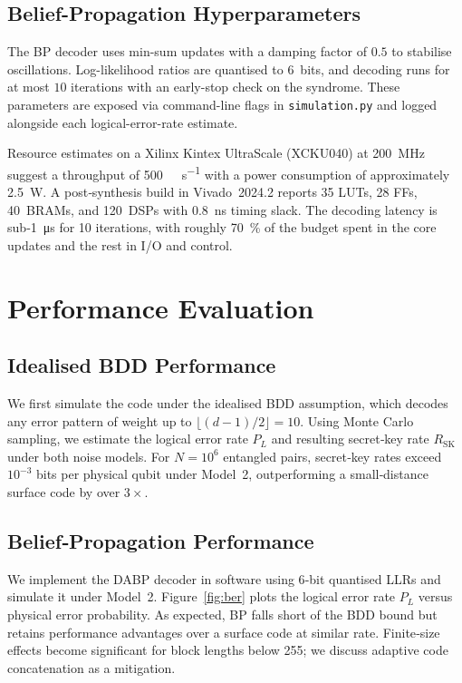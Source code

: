 \documentclass[conference]{IEEEtran}
\begin{document}
    \subsection{Belief-Propagation Hyperparameters}
    The BP decoder uses min-sum updates with a damping factor of $0.5$ to
    stabilise oscillations.  Log-likelihood ratios are quantised to
    $6$~bits, and decoding runs for at most $10$ iterations with an
    early-stop check on the syndrome.  These parameters are exposed via
    command-line flags in \texttt{simulation.py} and logged alongside
    each logical-error-rate estimate.

    Resource estimates on a Xilinx Kintex UltraScale (XCKU040) at \SI{200}{\mega\hertz} suggest a throughput of
\SI{500}{\mega\codeword\per\second} with a power consumption of approximately \SI{2.5}{\watt}.  A post‑synthesis build
in Vivado~2024.2 reports \SI{35}{\kilo} LUTs, \SI{28}{\kilo} FFs, 40~BRAMs, and 120~DSPs with \SI{0.8}{\nano\second}
timing slack.  The decoding latency is sub‑\SI{1}{\micro\second} for 10 iterations, with roughly
\SI{70}{\percent} of the budget spent in the core updates and the rest in I/O and control.

    \section{Performance Evaluation}

    \subsection{Idealised BDD Performance}
    We first simulate the code under the idealised BDD assumption, which decodes any error pattern of weight up to 
$\lfloor (d-1)/2 \rfloor=10$.  Using Monte Carlo sampling, we estimate the logical error rate $P_L$ and resulting 
secret‑key rate $R_{\mathrm{SK}}$ under both noise models.  For $N=10^6$ entangled pairs, secret‑key rates exceed 
$10^{-3}$ bits per physical qubit under Model 2, outperforming a small‑distance surface code by over $3\times$.

    \subsection{Belief‑Propagation Performance}
    We implement the DABP decoder in software using 6‑bit quantised LLRs and simulate it under Model 2.  
Figure~\ref{fig:ber} plots the logical error rate $P_L$ versus physical error probability.  As expected, BP falls short 
of the BDD bound but retains performance advantages over a surface code at similar rate.  Finite‑size effects become 
significant for block lengths below 255; we discuss adaptive code concatenation as a mitigation.
\end{document}
